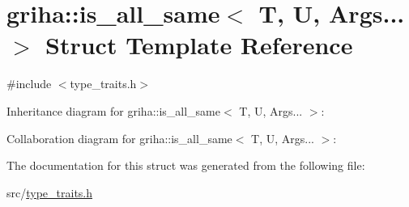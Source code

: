 \hypertarget{structgriha_1_1is__all__same_3_01_t_00_01_u_00_01_args_8_8_8_01_4}{}\section{griha\+:\+:is\+\_\+all\+\_\+same$<$ T, U, Args... $>$ Struct Template Reference}
\label{structgriha_1_1is__all__same_3_01_t_00_01_u_00_01_args_8_8_8_01_4}


{\ttfamily \#include $<$type\+\_\+traits.\+h$>$}



Inheritance diagram for griha\+:\+:is\+\_\+all\+\_\+same$<$ T, U, Args... $>$\+:


Collaboration diagram for griha\+:\+:is\+\_\+all\+\_\+same$<$ T, U, Args... $>$\+:


The documentation for this struct was generated from the following file\+:\begin{DoxyCompactItemize}
\item 
src/\hyperlink{type__traits_8h}{type\+\_\+traits.\+h}\end{DoxyCompactItemize}
